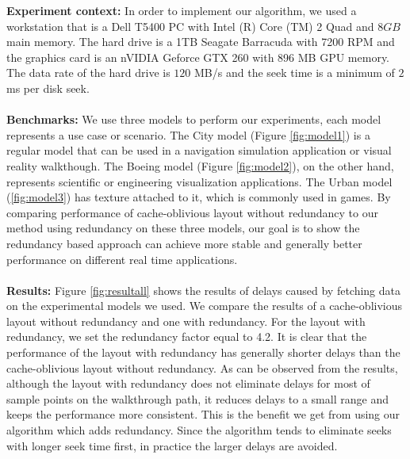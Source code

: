 \documentclass[conference]{acmsiggraph}
\begin{document}
\textbf{Experiment context:}
In order to implement our algorithm, we used a workstation that is a Dell T5400 PC with Intel (R) Core (TM) 2 Quad and $8GB$ main memory. The hard drive is a 1TB Seagate Barracuda with 7200 RPM and the graphics card is an nVIDIA Geforce GTX 260 with 896 MB GPU memory. The data rate of the hard drive is $120$ MB/s and the seek time is a minimum of $2$ ms per disk seek.\\
\\
\textbf{Benchmarks:}
We use three models to perform our experiments, each model represents a use case or scenario. The City model (Figure \ref{fig:model1}) is a regular model that can be used in a navigation simulation application or visual reality walkthough. The Boeing model (Figure \ref{fig:model2}), on the other hand, represents scientific or engineering visualization applications. The Urban model (\ref{fig:model3}) has texture attached to it, which is commonly used in games. By comparing performance of cache-oblivious layout without redundancy to our method using redundancy on these three models, our goal is to show the redundancy based approach can achieve more stable and generally better performance on different real time applications. \\
\\
\textbf{Results:}
Figure \ref{fig:resultall} shows the results of delays caused by fetching data on the experimental models we used. We compare the results of a cache-oblivious layout without redundancy and one with redundancy. For the layout with redundancy, we set the redundancy factor equal to 4.2. It is clear that the performance of the layout with redundancy has generally shorter delays than the cache-oblivious layout without redundancy. As can be observed from the results, although the layout with redundancy does not eliminate delays for most of sample points on the walkthrough path, it reduces delays to a small range and keeps the performance more consistent. This is the benefit we get from using our algorithm which adds redundancy. Since the algorithm tends to eliminate seeks with longer seek time first, in practice the larger delays are avoided.\\
\\
\end{document}
